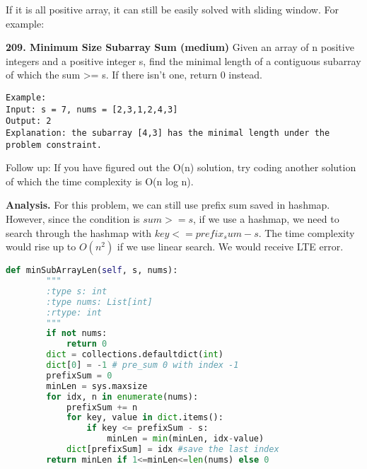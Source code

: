 \documentclass[../main.tex]{subfiles}
\begin{document}
If it is all positive array, it can still be easily solved with sliding window. For example: 
\begin{examples}[resume]
\item \textbf{209. Minimum Size Subarray Sum (medium)} Given an array of n positive integers and a positive integer s, find the minimal length of a contiguous subarray of which the sum >= s. If there isn't one, return 0 instead.
\begin{lstlisting}[numbers=none]
Example: 
Input: s = 7, nums = [2,3,1,2,4,3]
Output: 2
Explanation: the subarray [4,3] has the minimal length under the problem constraint.
\end{lstlisting}
Follow up: If you have figured out the O(n) solution, try coding another solution of which the time complexity is O(n log n). 

\textbf{Analysis.} For this problem, we can still use prefix sum saved in hashmap. However, since the condition is $sum >= s$, if we use a hashmap, we need to search through the hashmap with $key <= prefix_sum - s$. The time complexity would rise up to $O(n^2)$ if we use linear search. We would receive LTE error.
\begin{lstlisting}[language = Python]
    def minSubArrayLen(self, s, nums):
        """
        :type s: int
        :type nums: List[int]
        :rtype: int
        """
        if not nums:
            return 0
        dict = collections.defaultdict(int)
        dict[0] = -1 # pre_sum 0 with index -1
        prefixSum = 0
        minLen = sys.maxsize
        for idx, n in enumerate(nums):
            prefixSum += n
            for key, value in dict.items():
                if key <= prefixSum - s: 
                    minLen = min(minLen, idx-value)
            dict[prefixSum] = idx #save the last index
        return minLen if 1<=minLen<=len(nums) else 0
\end{lstlisting}


\end{examples}
\end{document}
